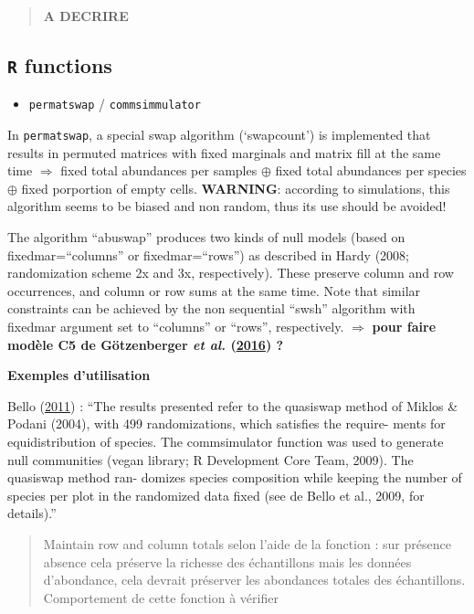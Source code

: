 \documentclass[]{article}
\providecommand{\tightlist}{%
  \setlength{\itemsep}{0pt}\setlength{\parskip}{0pt}}
\begin{document}
\begin{quote}
\textbf{A DECRIRE}
\end{quote}

\subsection{\texorpdfstring{\texttt{R}
functions}{R functions}}\label{r-functions}

\begin{itemize}
\tightlist
\item
  \texttt{permatswap} / \texttt{commsimmulator}
\end{itemize}

In \texttt{permatswap}, a special swap algorithm (`swapcount') is
implemented that results in permuted matrices with fixed marginals and
matrix fill at the same time \(\Rightarrow\) fixed total abundances per
samples \(\oplus\) fixed total abundances per species \(\oplus\) fixed
porportion of empty cells. \textbf{WARNING}: according to simulations,
this algorithm seems to be biased and non random, thus its use should be
avoided!

The algorithm ``abuswap'' produces two kinds of null models (based on
fixedmar=``columns'' or fixedmar=``rows'') as described in Hardy (2008;
randomization scheme 2x and 3x, respectively). These preserve column and
row occurrences, and column or row sums at the same time. Note that
similar constraints can be achieved by the non sequential ``swsh''
algorithm with fixedmar argument set to ``columns'' or ``rows'',
respectively. \(\Rightarrow\) \textbf{pour faire modèle C5 de
Götzenberger \emph{et al.}
(\protect\hyperlink{ref-gotzenberger2016randomizations}{2016}) ?}

\textbf{Exemples d'utilisation}

Bello (\protect\hyperlink{ref-de_Bello_2011}{2011}) : ``The results
presented refer to the quasiswap method of Miklos \& Podani (2004), with
499 randomizations, which satisfies the require- ments for
equidistribution of species. The commsimulator function was used to
generate null communities (vegan library; R Development Core Team,
2009). The quasiswap method ran- domizes species composition while
keeping the number of species per plot in the randomized data fixed (see
de Bello et al., 2009, for details).''

\begin{quote}
Maintain row and column totals selon l'aide de la fonction : sur
présence absence cela préserve la richesse des échantillons mais les
données d'abondance, cela devrait préserver les abondances totales des
échantillons. Comportement de cette fonction à vérifier
\end{quote}
\end{document}
